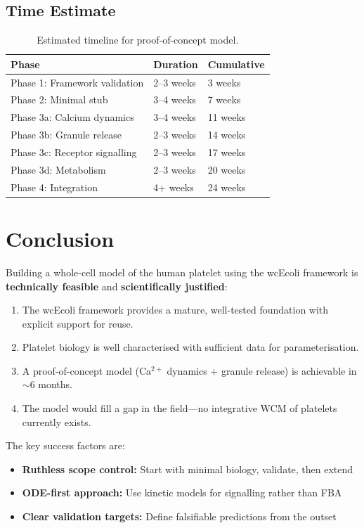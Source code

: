 \documentclass[11pt,a4paper]{report}
\begin{document}
\subsection{Time Estimate}

\begin{table}[h]
\centering
\begin{tabular}{lll}
\toprule
\textbf{Phase} & \textbf{Duration} & \textbf{Cumulative} \\
\midrule
Phase 1: Framework validation & 2--3 weeks & 3 weeks \\
Phase 2: Minimal stub & 3--4 weeks & 7 weeks \\
Phase 3a: Calcium dynamics & 3--4 weeks & 11 weeks \\
Phase 3b: Granule release & 2--3 weeks & 14 weeks \\
Phase 3c: Receptor signalling & 2--3 weeks & 17 weeks \\
Phase 3d: Metabolism & 2--3 weeks & 20 weeks \\
Phase 4: Integration & 4+ weeks & 24 weeks \\
\bottomrule
\end{tabular}
\caption{Estimated timeline for proof-of-concept model.}
\end{table}

\section{Conclusion}

Building a whole-cell model of the human platelet using the wcEcoli framework is \textbf{technically feasible} and \textbf{scientifically justified}:

\begin{enumerate}
    \item The wcEcoli framework provides a mature, well-tested foundation with explicit support for reuse.
    \item Platelet biology is well characterised with sufficient data for parameterisation.
    \item A proof-of-concept model (Ca$^{2+}$ dynamics + granule release) is achievable in $\sim$6 months.
    \item The model would fill a gap in the field---no integrative WCM of platelets currently exists.
\end{enumerate}

The key success factors are:

\begin{itemize}
    \item \textbf{Ruthless scope control:} Start with minimal biology, validate, then extend
    \item \textbf{ODE-first approach:} Use kinetic models for signalling rather than FBA
    \item \textbf{Clear validation targets:} Define falsifiable predictions from the outset
\end{itemize}
\end{document}
